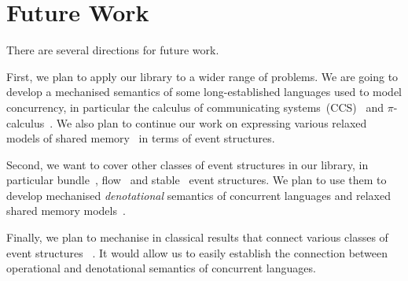 \section{Future Work}

There are several directions for future work. 

First, we plan to apply our library to a wider range of problems. 
We are going to develop a mechanised semantics of some long-established
languages used to model concurrency, in particular 
the calculus of communicating systems~(CCS)~\cite{Milner:80} and 
$\pi$-calculus~\cite{Milner:99}.      
We also plan to continue our work on 
expressing various relaxed models 
of shared memory~\cite{Lahav-al:POPL16, Lahav-al:PLDI17, Podkopaev-al:POPL19}
in terms of event structures.  

Second, we want to cover other classes of event structures in our library, 
in particular bundle~\cite{Langerak:91}, flow~\cite{Boudol-Castellani:1991}
and stable~\cite{Winskel:82, Winskel:86} event structures.
We plan to use them to develop mechanised \emph{denotational} semantics 
of concurrent languages and relaxed shared memory models~\cite{Dodds-al:ESOP18}.  

Finally, we plan to mechanise in \coq classical results 
that connect various classes of event structures%
~\cite{Nielsen-al:1981, Boudol-Castellani:1991}. 
It would allow us to easily establish the connection between operational and denotational 
semantics of concurrent languages.
